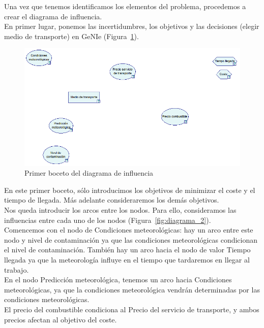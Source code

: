\documentclass[12pt,a4paper,twoside,openright,titlepage,final]{article}
\begin{document}
Una vez que tenemos identificamos los elementos del problema, procedemos a crear el diagrama de influencia.\\

En primer lugar, ponemos las incertidumbres, los objetivos y las decisiones (elegir medio de transporte) en GeNIe (Figura~\ref{fig:diagrama_1}).\\
 

\begin{figure}[tbph!]
\centering
\includegraphics[width=0.9\linewidth]{imagenes/diagrama_1}
\caption{Primer boceto del diagrama de influencia}
\label{fig:diagrama_1}
\end{figure}

En este primer boceto, sólo introducimos los objetivos de minimizar el coste y el tiempo de llegada. Más adelante consideraremos los demás objetivos.\\

Nos queda introducir los arcos entre los nodos. Para ello, consideramos las influencias entre cada uno de los nodos (Figura~\ref{fig:diagrama_2}).\\

Comencemos con el nodo de Condiciones meteorológicas: hay un arco entre este nodo y nivel de contaminación ya que las condiciones meteorológicas condicionan el nivel de contaminación. También hay un arco hacia el nodo de valor Tiempo llegada ya que la meteorología influye en el tiempo que tardaremos en llegar al trabajo.\\

En el nodo Predicción meteorológica, tenemos un arco hacia Condiciones meteorológicas, ya que la condiciones meteorológica vendrán determinadas por las condiciones meteorológicas.\\

El precio del combustible condiciona al Precio del servicio de transporte, y ambos precios afectan al objetivo del coste.\\
\end{document}
